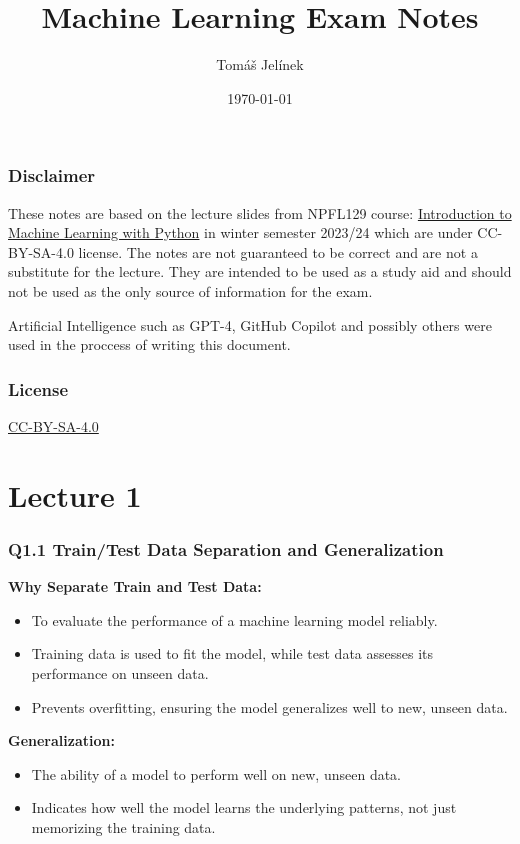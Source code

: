 \documentclass[11pt]{article}
\title{Machine Learning Exam Notes}
\author{Tomáš Jelínek}
\date{\today}
\begin{document}
\maketitle

\tableofcontents

\newpage

\section{Disclaimer}
These notes are based on the lecture slides from NPFL129 course: \href{https://ufal.mff.cuni.cz/courses/npfl129/2324-winter#home}{Introduction to Machine Learning with Python} in winter semester 2023/24 which are under CC-BY-SA-4.0 license. The notes are not guaranteed to be correct and are not a substitute for the lecture. They are intended to be used as a study aid and should not be used as the only source of information for the exam.

Artificial Intelligence such as GPT-4, GitHub Copilot and possibly others were used in the proccess of writing this document.

\section{License}
\href{https://creativecommons.org/licenses/by-sa/4.0/}{CC-BY-SA-4.0}

\part{Lecture 1}
\section{Q1.1 Train/Test Data Separation and Generalization}

\textbf{Why Separate Train and Test Data:}
\begin{itemize}
    \item To evaluate the performance of a machine learning model reliably.
    \item Training data is used to fit the model, while test data assesses its performance on unseen data.
    \item Prevents overfitting, ensuring the model generalizes well to new, unseen data.
\end{itemize}

\textbf{Generalization:}
\begin{itemize}
    \item The ability of a model to perform well on new, unseen data.
    \item Indicates how well the model learns the underlying patterns, not just memorizing the training data.
\end{itemize}
\end{document}
